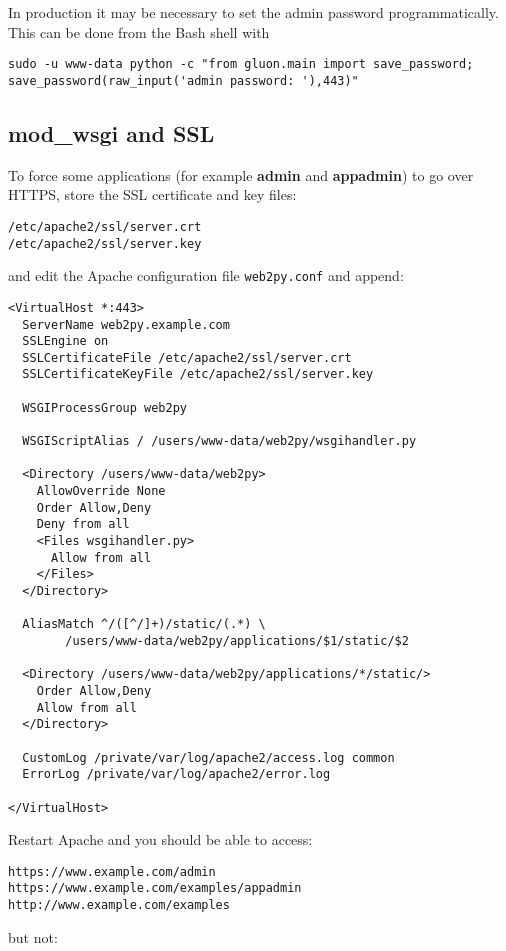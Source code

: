\documentclass[justified,sixbynine,notoc]{tufte-book}
\def\ft{\small\tt}
\begin{document}
\begin{fullwidth}
In production it may be necessary to set the admin password programmatically.
This can be done from the Bash shell with

\begin{lstlisting}
sudo -u www-data python -c "from gluon.main import save_password; save_password(raw_input('admin password: '),443)"
\end{lstlisting}

\goodbreak\subsection{mod\_wsgi and SSL}

To force some applications (for example {\bf admin} and {\bf appadmin}) to go over HTTPS, store the SSL certificate and key files:
\begin{lstlisting}
/etc/apache2/ssl/server.crt
/etc/apache2/ssl/server.key
\end{lstlisting}
\noindent and edit the Apache configuration file {\ft web2py.conf} and append:
\begin{lstlisting}[keywords={}]
<VirtualHost *:443>
  ServerName web2py.example.com
  SSLEngine on
  SSLCertificateFile /etc/apache2/ssl/server.crt
  SSLCertificateKeyFile /etc/apache2/ssl/server.key

  WSGIProcessGroup web2py

  WSGIScriptAlias / /users/www-data/web2py/wsgihandler.py

  <Directory /users/www-data/web2py>
    AllowOverride None
    Order Allow,Deny
    Deny from all
    <Files wsgihandler.py>
      Allow from all
    </Files>
  </Directory>

  AliasMatch ^/([^/]+)/static/(.*) \
        /users/www-data/web2py/applications/$1/static/$2

  <Directory /users/www-data/web2py/applications/*/static/>
    Order Allow,Deny
    Allow from all
  </Directory>

  CustomLog /private/var/log/apache2/access.log common
  ErrorLog /private/var/log/apache2/error.log

</VirtualHost>
\end{lstlisting}

Restart Apache and you should be able to access:

\begin{lstlisting}[keywords={}]
https://www.example.com/admin
https://www.example.com/examples/appadmin
http://www.example.com/examples
\end{lstlisting}
\noindent but not:


\end{fullwidth}
\end{document}

